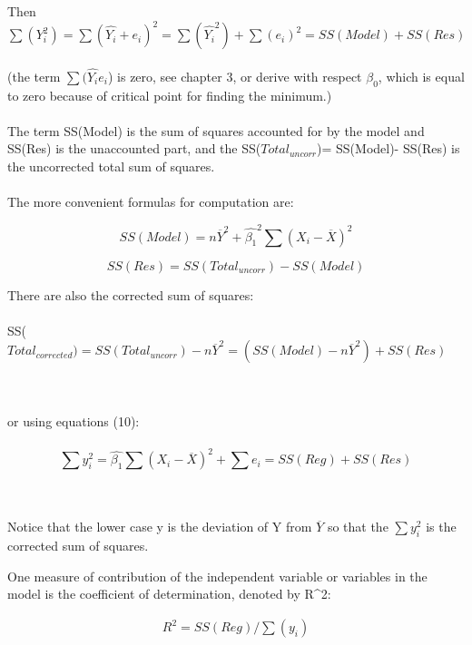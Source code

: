 \documentclass[letterpaper,11pt]{article}
\begin{document}
	Then $\sum (Y_{i}^2)= \sum (\hat{Y_{i}}+ e_{i})^2= \sum (\hat{Y_{i}}^2) + \sum (e_{i})^2= SS(Model)+ SS(Res)$
	\\ \\
	(the term $\sum (\hat{Y_{i}} e_{i}$) is zero, see chapter 3, or derive with respect $\beta_{0}$, which is equal to zero because of 
	critical point for finding the minimum.)
	\\ \\
	The term SS(Model) is the sum of squares accounted for by the model and SS(Res) is the unaccounted part, and the SS($Total_{uncorr}$)=
	SS(Model)- SS(Res) is the uncorrected total sum of squares.
	\\ \\
	The more convenient formulas for computation are:
	
	\begin{equation}	
	SS(Model)= n \overline{Y}^2 + \hat{\beta_{1}}^2 \sum(X_{i} - \overline{X})^2
	\end{equation}
		
	\begin{equation}		
	SS(Res)= SS(Total_{uncorr})- SS(Model)
	\end{equation}	
	
	There are also the corrected sum of squares:
	\\ \\
	SS($Total_{corrected})= SS(Total_{uncorr}) - n \overline{Y}^2= ( SS(Model)- n \overline{Y}^2) + SS(Res)$ 
	
	\\ \\
	or using equations (10):
	\\ \\
	
		\begin{equation}
		\sum{y_{i}^2}= \hat{\beta_{1}} \sum (X_{i}- \overline{X})^2 + \sum{e_{i}} = SS(Reg) + SS(Res)
		\end{equation}
	
	\\ \\
	Notice that the lower case y is the deviation of Y from $\overline{Y}$ so that the $\sum y_{i}^2$ is the corrected sum of squares.
	
	One measure of contribution of the independent variable or variables in the model is the coefficient of determination, denoted by R^2:

	\begin{equation}	
	\begin{gathered}
	R^2= SS(Reg)/ \sum(y_{i})
	\end{gathered}
	\end{equation}
	
\end{document}
